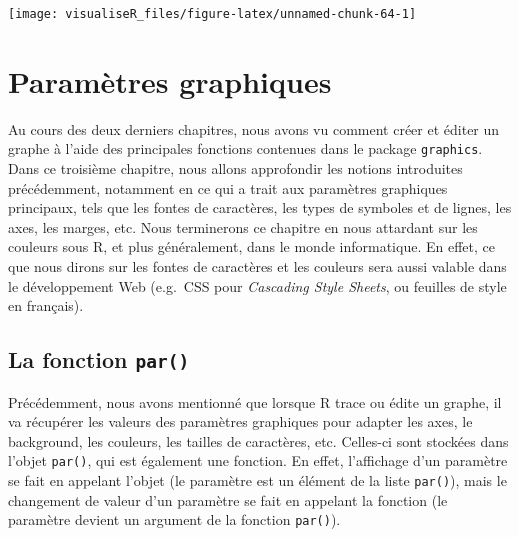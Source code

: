 \documentclass[]{article}
\newenvironment{Shaded}{\begin{snugshade}}{\end{snugshade}}
\newcommand{\CommentTok}[1]{\textcolor[rgb]{0.56,0.35,0.01}{\textit{#1}}}
\newcommand{\KeywordTok}[1]{\textcolor[rgb]{0.13,0.29,0.53}{\textbf{#1}}}
\newcommand{\NormalTok}[1]{#1}
\newcommand{\OperatorTok}[1]{\textcolor[rgb]{0.81,0.36,0.00}{\textbf{#1}}}
\begin{document}
\begin{center}\texttt{[image: visualiseR\_files/figure-latex/unnamed-chunk-64-1]} \end{center}

\hypertarget{paramuxe8tres-graphiques}{%
\section{Paramètres graphiques}\label{paramuxe8tres-graphiques}}

Au cours des deux derniers chapitres, nous avons vu comment créer et éditer un graphe à l'aide des principales fonctions contenues dans le package \texttt{graphics}. Dans ce troisième chapitre, nous allons approfondir les notions introduites précédemment, notamment en ce qui a trait aux paramètres graphiques principaux, tels que les fontes de caractères, les types de symboles et de lignes, les axes, les marges, etc. Nous terminerons ce chapitre en nous attardant sur les couleurs sous R, et plus généralement, dans le monde informatique. En effet, ce que nous dirons sur les fontes de caractères et les couleurs sera aussi valable dans le développement Web (e.g.~CSS pour \emph{Cascading Style Sheets}, ou feuilles de style en français).

\hypertarget{la-fonction-par}{%
\subsection{\texorpdfstring{La fonction \texttt{par()}}{La fonction par()}}\label{la-fonction-par}}

Précédemment, nous avons mentionné que lorsque R trace ou édite un graphe, il va récupérer les valeurs des paramètres graphiques pour adapter les axes, le background, les couleurs, les tailles de caractères, etc. Celles-ci sont stockées dans l'objet \texttt{par()}, qui est également une fonction. En effet, l'affichage d'un paramètre se fait en appelant l'objet (le paramètre est un élément de la liste \texttt{par()}), mais le changement de valeur d'un paramètre se fait en appelant la fonction (le paramètre devient un argument de la fonction \texttt{par()}).

\begin{Shaded}
\end{Shaded}
\end{document}
